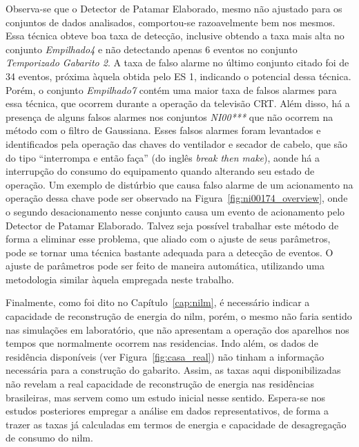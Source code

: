 Observa-se que o Detector de Patamar Elaborado, mesmo não ajustado
para os conjuntos de dados analisados, comportou-se razoavelmente bem
nos mesmos. Essa técnica obteve boa taxa de detecção, inclusive
obtendo a taxa mais alta no conjunto \emph{Empilhado4} e não
detectando apenas 6 eventos no conjunto \emph{Temporizado Gabarito 2}.
A taxa de falso alarme no último conjunto citado foi de 34 eventos,
próxima àquela obtida pelo ES 1, indicando o potencial dessa técnica.
Porém, o conjunto \emph{Empilhado7} contém uma maior taxa de falsos
alarmes para essa técnica, que ocorrem durante a operação da televisão
CRT. Além disso, há a presença de alguns falsos alarmes nos conjuntos
\emph{NI00***} que não ocorrem na método com o filtro de Gaussiana.
Esses falsos alarmes foram levantados e identificados pela operação
das chaves do ventilador e secador de cabelo, que são do tipo
``interrompa e então faça'' (do inglês \emph{break then make}), aonde
há a interrupção do consumo do equipamento quando alterando seu estado
de operação. Um exemplo de distúrbio que causa falso alarme de um
acionamento na operação dessa chave pode ser observado na
Figura~\ref{fig:ni00174_overview}, onde o segundo desacionamento nesse
conjunto causa um evento de acionamento pelo Detector de Patamar
Elaborado. Talvez seja possível trabalhar este método de forma a
eliminar esse problema, que aliado com o ajuste de seus parâmetros,
pode se tornar uma técnica bastante adequada para a detecção de
eventos. O ajuste de parâmetros pode ser feito de maneira automática,
utilizando uma metodologia similar àquela empregada neste trabalho.

Finalmente, como foi dito no Capítulo~\ref{cap:nilm}, é necessário
indicar a capacidade de reconstrução de energia do \acs{nilm}, porém, o
mesmo não faria sentido nas simulações em laboratório, que não
apresentam a operação dos aparelhos nos tempos que normalmente ocorrem
nas residencias. Indo além, os dados de residência disponíveis (ver
Figura~\ref{fig:casa_real}) não tinham a informação necessária para a
construção do gabarito. Assim, as taxas aqui disponibilizadas não
revelam a real capacidade de reconstrução de energia nas residências
brasileiras, mas servem como um estudo inicial nesse sentido.
Espera-se nos estudos posteriores empregar a análise em dados
representativos, de forma a trazer as taxas já calculadas em termos de
energia e capacidade de desagregação de consumo do \acs{nilm}.


